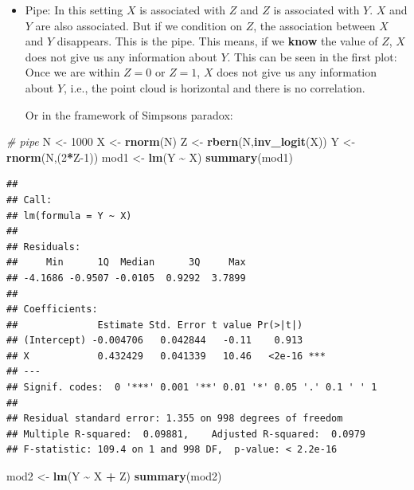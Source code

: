 \documentclass[
]{book}
\newenvironment{Shaded}{\begin{snugshade}}{\end{snugshade}}
\newcommand{\CommentTok}[1]{\textcolor[rgb]{0.56,0.35,0.01}{\textit{#1}}}
\newcommand{\DecValTok}[1]{\textcolor[rgb]{0.00,0.00,0.81}{#1}}
\newcommand{\FunctionTok}[1]{\textcolor[rgb]{0.13,0.29,0.53}{\textbf{#1}}}
\newcommand{\NormalTok}[1]{#1}
\newcommand{\OtherTok}[1]{\textcolor[rgb]{0.56,0.35,0.01}{#1}}
\newcommand{\SpecialCharTok}[1]{\textcolor[rgb]{0.81,0.36,0.00}{\textbf{#1}}}
\begin{document}
\begin{itemize}
\item
  Pipe: In this setting \(X\) is associated with \(Z\) and \(Z\) is associated with \(Y\). \(X\) and \(Y\) are also associated.
  But if we condition on \(Z\), the association between \(X\) and \(Y\) disappears. This is the pipe.
  This means, if we \textbf{know} the value of \(Z\), \(X\) does not give us any information about \(Y\).
  This can be seen in the first plot: Once we are within \(Z=0\) or \(Z=1\), \(X\) does not give us any information about \(Y\),
  i.e., the point cloud is horizontal and there is no correlation.

  Or in the framework of Simpsons paradox:
\end{itemize}

\begin{Shaded}
\begin{Highlighting}[]
\CommentTok{\# pipe}
\NormalTok{N }\OtherTok{\textless{}{-}} \DecValTok{1000}
\NormalTok{X }\OtherTok{\textless{}{-}} \FunctionTok{rnorm}\NormalTok{(N)}
\NormalTok{Z }\OtherTok{\textless{}{-}} \FunctionTok{rbern}\NormalTok{(N,}\FunctionTok{inv\_logit}\NormalTok{(X))}
\NormalTok{Y }\OtherTok{\textless{}{-}} \FunctionTok{rnorm}\NormalTok{(N,(}\DecValTok{2}\SpecialCharTok{*}\NormalTok{Z}\DecValTok{{-}1}\NormalTok{))}
\NormalTok{mod1 }\OtherTok{\textless{}{-}} \FunctionTok{lm}\NormalTok{(Y }\SpecialCharTok{\textasciitilde{}}\NormalTok{ X)}
\FunctionTok{summary}\NormalTok{(mod1)}
\end{Highlighting}
\end{Shaded}

\begin{verbatim}
## 
## Call:
## lm(formula = Y ~ X)
## 
## Residuals:
##     Min      1Q  Median      3Q     Max 
## -4.1686 -0.9507 -0.0105  0.9292  3.7899 
## 
## Coefficients:
##              Estimate Std. Error t value Pr(>|t|)    
## (Intercept) -0.004706   0.042844   -0.11    0.913    
## X            0.432429   0.041339   10.46   <2e-16 ***
## ---
## Signif. codes:  0 '***' 0.001 '**' 0.01 '*' 0.05 '.' 0.1 ' ' 1
## 
## Residual standard error: 1.355 on 998 degrees of freedom
## Multiple R-squared:  0.09881,    Adjusted R-squared:  0.0979 
## F-statistic: 109.4 on 1 and 998 DF,  p-value: < 2.2e-16
\end{verbatim}

\begin{Shaded}
\begin{Highlighting}[]
\NormalTok{mod2 }\OtherTok{\textless{}{-}} \FunctionTok{lm}\NormalTok{(Y }\SpecialCharTok{\textasciitilde{}}\NormalTok{ X }\SpecialCharTok{+}\NormalTok{ Z)}
\FunctionTok{summary}\NormalTok{(mod2)}
\end{Highlighting}
\end{Shaded}
\end{document}
